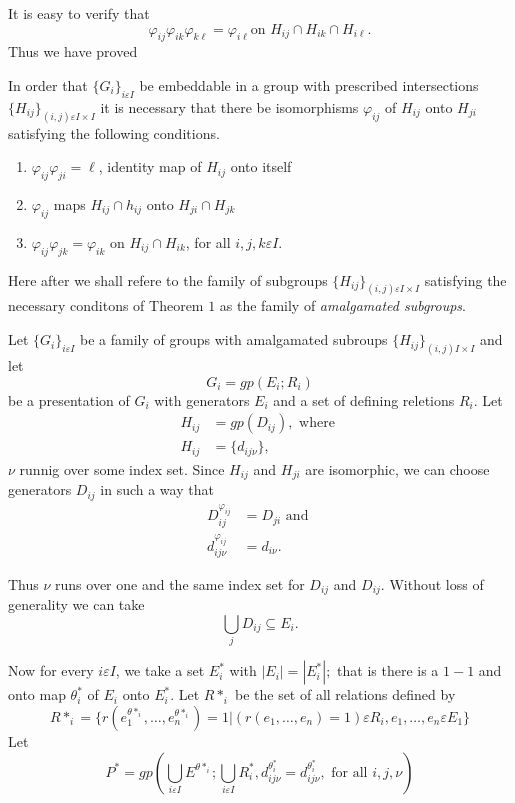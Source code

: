 It is easy to verify that 
$$
\varphi_{ij} \varphi_{ik} \varphi_{k \ell} = \varphi_{i \ell} \text{
  on } H_{ij} \cap H_{ik} \cap H_{ i \ell}. 
$$
Thus we have proved 
\setcounter{Theorem}{0}
\begin{Theorem}%
  In order that $\big\{ G_i \big\}_{i \varepsilon I}$ be embeddable in
  a group with prescribed intersections $\big\{ H_{ij} \big\}_{(i, j)
    \varepsilon I \times I}$ it is necessary that there be
  isomorphisms $\varphi_{ij}$ of $H_{ij}$ onto $H_{ji}$ satisfying the
  following conditions. 
\end{Theorem}

\begin{enumerate}[(1)]
\item $ \varphi_{ij} \varphi_{ji}= \ell$, identity map of $H_{ij}$ onto itself 
\item $\varphi_{ij}$ maps $H_{ij} \cap h_{ij}$ onto $H_{ji} \cap H_{jk}$
\item $\varphi_{ij} \varphi_{jk}= \varphi_{ik}$ on $H_{ij} \cap
  H_{ik}$, for all $i,j,k \varepsilon I$. 
\end{enumerate}

Here after we shall refere to the family of subgroups $\big\{ H_{ij}
\big\}_{(i, j) \varepsilon I \times I}$ satisfying the necessary
conditons of Theorem $1$ as the family of \textit{ amalgamated
  subgroups}. 

Let $\big\{ G_{i} \big\}_{i \varepsilon I}$ be a family of groups with
amalgamated subroups \break $\big\{ H_{ij} \big\}_{(i, j)  I \times I}$ and
let  
$$
G_i = gp (E_i ; R_i)
$$
be a presentation of $G_i$ with generators $E_i$ and a set of defining
reletions $R_i$. Let  
\begin{align*}
  H_{ij} & = gp(D_{ij}), \text{ where }\\
  H_{ij} & = \big\{ d_{i j \nu} \big\},
\end{align*} 
$\nu$ runnig over some index set. Since $H_{ij}$ and $H_{ji}$ are
isomorphic, we can choose generators $D_{ij}$ in such a way that  
\begin{align*}
  D^{\varphi_{ij}}_{ij}& = D_{ji} \text{ and }\\
  d^{\varphi_{ij}}_{ij \nu}& = d_{i \nu}.
\end{align*}

Thus $\nu$ runs over one and the same index set for $D_{ij}$ and
$D_{ij}$. Without loss of generality we can take  
$$
\bigcup_j D_{ij} \subseteq E_i.
$$

Now for every $i \varepsilon I$, we take a set $E^*_i$ with
$|E_i|=|E^*_i|;$ that is there is a $1-1$ and onto map $\theta^*_i$ of
$E_i$ onto $E^*_i$. Let $R*_i$ be the set of all relations defined by 
$$
R*_i = \Bigg\{ r(e^{\theta*_i}_1, \ldots,  e^{\theta*_i}_n) =1 \Big|
(r(e_1, \ldots,  e_n) = 1) \varepsilon R_i,  e_1, \ldots, e_n
\varepsilon E_1 \Bigg\} 
$$
Let
$$
P^* = gp\left(\bigcup_{i \varepsilon I} E^{\theta*_i}; \bigcup_{i
  \varepsilon I} R^*_i,  d^{\theta^*_i}_{i j \nu}= d^{\theta^*_i}_{i j
  \nu}, \text{ for all } i,j,  \nu \right) 
$$ 

